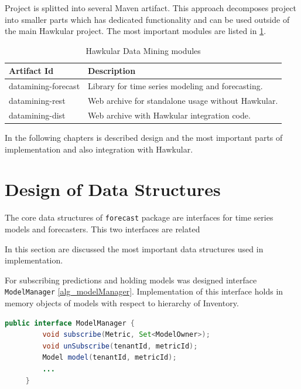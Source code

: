 Project is splitted into several Maven artifact. This approach decomposes project into smaller parts
which has dedicated functionality and can be used outside of the main Hawkular project. The most important modules
are listed in \ref{tab:datamining-modules}.

\begin{table}[h]
    \begin{center}
        \begin{tabular}{l|l}
                \textbf{Artifact Id} & \textbf{Description} \\ \hline \hline
                datamining-forecast & Library for time series modeling and forecasting. \\
                datamining-rest & Web archive for standalone usage without Hawkular. \\
                datamining-dist & Web archive with Hawkular integration code.
        \end{tabular}
        \caption{Hawkular Data Mining modules}
        \label{tab:datamining-modules}
    \end{center}
\end{table}

In the following chapters is described design and the most important parts of implementation and also
integration with Hawkular.

    \section{Design of Data Structures}
    The core data structures of \texttt{forecast} package are interfaces for time series models and
    forecasters. This two interfaces are related

    In this section are discussed the most important data structures used in implementation.

    For subscribing predictions and holding models was designed interface
    \texttt{ModelManager} \ref{alg_modelManager}.
    Implementation of this interface holds in memory
    objects of models with respect to hierarchy of Inventory.

    \begin{lstlisting}[caption={Interface Model Manager}, language=Java, label={alg_modelManager}]
     public interface ModelManager {
         void subscribe(Metric, Set<ModelOwner>);
         void unSubscribe(tenantId, metricId);
         Model model(tenantId, metricId);
         ...
     }
    \end{lstlisting}

